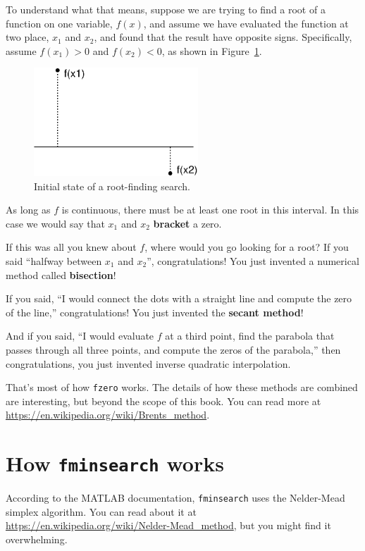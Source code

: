 \documentclass[
]{book}
\numberwithin{Answer}{chapter}
\numberwithin{Exercise}{chapter}
\begin{document}
To understand what that means, suppose we are trying to find a root of a function on one variable, $f(x)$, and assume we have evaluated the function at two place, $x_1$ and $x_2$, and found that the result have opposite signs.  Specifically, assume $f(x_1) > 0$ and $f(x_2) < 0$, as shown in Figure~\ref{fig:secant}.

\begin{figure}
\centerline{\includegraphics[height=1.6in]{book/figs/secant.eps}}
\caption{Initial state of a root-finding search.}
\label{fig:secant}
\end{figure}

As long as $f$ is continuous, there must be at least one root in this interval.  In this case we would say that $x_1$ and $x_2$
{\bf bracket} a zero.


If this was all you knew about $f$, where would you go looking for
a root?  If you said ``halfway between $x_1$ and $x_2$'',
congratulations!  You just invented a numerical method called
{\bf bisection}!

If you said, ``I would connect the dots with a straight line
and compute the zero of the line,''
congratulations!  You just invented the {\bf secant method}!

And if you said, ``I would evaluate $f$ at a third point, find the
parabola that passes through all three points, and compute the zeros
of the parabola,'' then congratulations, you just invented inverse quadratic interpolation.

That's most of how {\tt fzero} works.  The details of how these methods are combined are interesting, but beyond the scope of this book.  You can read more at \url{https://en.wikipedia.org/wiki/Brents_method}.  


\section{How {\tt fminsearch} works}
\label{sect:howfminsearch}

According to the MATLAB documentation, {\tt fminsearch} uses the Nelder-Mead simplex algorithm.  You can read about it at \url{https://en.wikipedia.org/wiki/Nelder-Mead_method}, but you might find it 
overwhelming.
\end{document}
